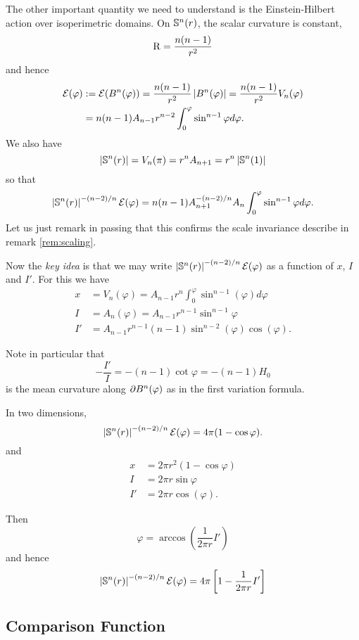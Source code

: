 \documentclass{amsart}
\begin{document}
The other important quantity we need to understand is the Einstein-Hilbert action over isoperimetric domains. On \(\S^n(r)\), the scalar curvature is constant,
\[
\Sc = \frac{n(n-1)}{r^2}
\]
and hence
\[
\begin{split}
\einsteinhilbert(\varphi) &:= \einsteinhilbert(B^n(\varphi)) = \frac{n(n-1)}{r^2} \abs{B^n(\varphi)} = \frac{n(n-1)}{r^2} V_n(\varphi) \\
&= n(n-1) A_{n-1} r^{n-2} \int_0^{\varphi} \sin^{n-1} \varphi d\varphi.
\end{split}
\]
We also have
\[
\abs{\S^n(r)} = V_n(\pi) = r^n A_{n+1} = r^n \abs{\S^n(1)}
\]
so that
\[
\abs{\S^n(r)}^{-(n-2)/n} \einsteinhilbert(\varphi) = n(n-1)A_{n+1}^{-(n-2)/n} A_n \int_0^{\varphi} \sin^{n-1} \varphi d\varphi.
\]
Let us just remark in passing that this confirms the scale invariance describe in remark \ref{rem:scaling}.

Now the \emph{key idea} is that we may write \(\abs{\S^n(r)}^{-(n-2)/n} \einsteinhilbert(\varphi)\) as a function of \(x\), \(I\) and \(I'\). For this we have
\begin{align*}
x &= V_n(\varphi) = A_{n-1} r^n \int_0^{\varphi} \sin^{n-1} (\varphi) d\varphi \\
I &= A_n(\varphi) = A_{n-1} r^{n-1} \sin^{n-1} \varphi \\
I' &= A_{n-1} r^{n-1} (n-1) \sin^{n-2} (\varphi) \cos(\varphi).
\end{align*}

Note in particular that
\[
-\frac{I'}{I} = -(n-1) \cot \varphi = -(n-1) H_0
\]
is the mean curvature along \(\bdry{B^n(\varphi)}\) as in the first variation formula.

In two dimensions,
\[
\abs{\S^n(r)}^{-(n-2)/n} \einsteinhilbert(\varphi) = 4\pi (1 - \cos\varphi).
\]
and
\begin{align*}
x &= 2\pi r^2 (1-\cos\varphi) \\
I &= 2\pi r \sin \varphi \\
I' &= 2\pi r \cos(\varphi).
\end{align*}

Then
\[
\varphi = \arccos\left(\frac{1}{2\pi r} I'\right)
\]
and hence
\[
\abs{\S^n(r)}^{-(n-2)/n} \einsteinhilbert(\varphi) = 4\pi \left[1 - \frac{1}{2\pi r} I'\right]
\]
\subsection{Comparison Function}
\end{document}
